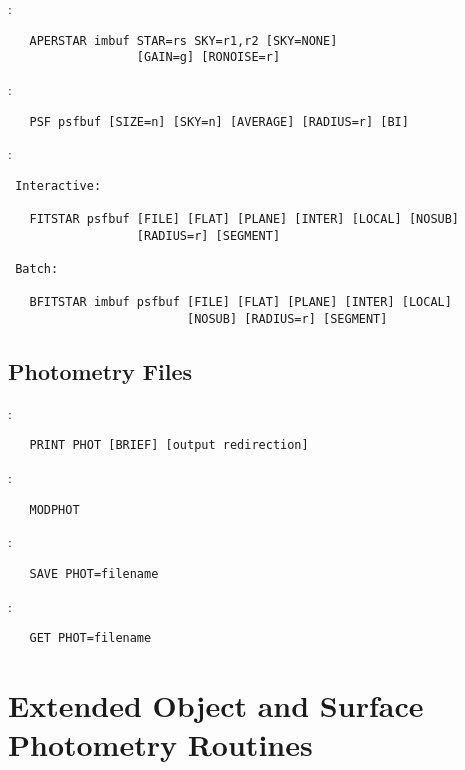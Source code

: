 :
\begin{verbatim}
   APERSTAR imbuf STAR=rs SKY=r1,r2 [SKY=NONE]
                  [GAIN=g] [RONOISE=r]
\end{verbatim}

\noindent {}:
\begin{verbatim}
   PSF psfbuf [SIZE=n] [SKY=n] [AVERAGE] [RADIUS=r] [BI]
\end{verbatim}

\noindent {}:
\begin{verbatim}
 Interactive:

   FITSTAR psfbuf [FILE] [FLAT] [PLANE] [INTER] [LOCAL] [NOSUB]
                  [RADIUS=r] [SEGMENT]

 Batch:

   BFITSTAR imbuf psfbuf [FILE] [FLAT] [PLANE] [INTER] [LOCAL]
                         [NOSUB] [RADIUS=r] [SEGMENT]
\end{verbatim}

\subsection{Photometry Files}

:
\begin{verbatim}
   PRINT PHOT [BRIEF] [output redirection]
\end{verbatim}

\noindent {}:
\begin{verbatim}
   MODPHOT
\end{verbatim}

\noindent {}:
\begin{verbatim}
   SAVE PHOT=filename
\end{verbatim}

\noindent {}:
\begin{verbatim}
   GET PHOT=filename
\end{verbatim}


\section{Extended Object and Surface Photometry Routines}

